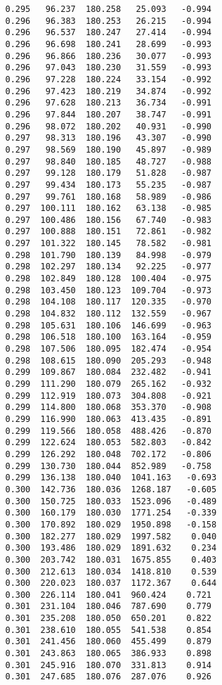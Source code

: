 \begin{verbatim}
   0.295   96.237  180.258   25.093   -0.994
   0.296   96.383  180.253   26.215   -0.994
   0.296   96.537  180.247   27.414   -0.994
   0.296   96.698  180.241   28.699   -0.993
   0.296   96.866  180.236   30.077   -0.993
   0.296   97.043  180.230   31.559   -0.993
   0.296   97.228  180.224   33.154   -0.992
   0.296   97.423  180.219   34.874   -0.992
   0.296   97.628  180.213   36.734   -0.991
   0.296   97.844  180.207   38.747   -0.991
   0.296   98.072  180.202   40.931   -0.990
   0.297   98.313  180.196   43.307   -0.990
   0.297   98.569  180.190   45.897   -0.989
   0.297   98.840  180.185   48.727   -0.988
   0.297   99.128  180.179   51.828   -0.987
   0.297   99.434  180.173   55.235   -0.987
   0.297   99.761  180.168   58.989   -0.986
   0.297  100.111  180.162   63.138   -0.985
   0.297  100.486  180.156   67.740   -0.983
   0.297  100.888  180.151   72.861   -0.982
   0.297  101.322  180.145   78.582   -0.981
   0.298  101.790  180.139   84.998   -0.979
   0.298  102.297  180.134   92.225   -0.977
   0.298  102.849  180.128  100.404   -0.975
   0.298  103.450  180.123  109.704   -0.973
   0.298  104.108  180.117  120.335   -0.970
   0.298  104.832  180.112  132.559   -0.967
   0.298  105.631  180.106  146.699   -0.963
   0.298  106.518  180.100  163.164   -0.959
   0.298  107.506  180.095  182.474   -0.954
   0.298  108.615  180.090  205.293   -0.948
   0.299  109.867  180.084  232.482   -0.941
   0.299  111.290  180.079  265.162   -0.932
   0.299  112.919  180.073  304.808   -0.921
   0.299  114.800  180.068  353.370   -0.908
   0.299  116.990  180.063  413.435   -0.891
   0.299  119.566  180.058  488.426   -0.870
   0.299  122.624  180.053  582.803   -0.842
   0.299  126.292  180.048  702.172   -0.806
   0.299  130.730  180.044  852.989   -0.758
   0.299  136.138  180.040  1041.163   -0.693
   0.300  142.736  180.036  1268.187   -0.605
   0.300  150.725  180.033  1523.096   -0.489
   0.300  160.179  180.030  1771.254   -0.339
   0.300  170.892  180.029  1950.898   -0.158
   0.300  182.277  180.029  1997.582    0.040
   0.300  193.486  180.029  1891.632    0.234
   0.300  203.742  180.031  1675.855    0.403
   0.300  212.613  180.034  1418.810    0.539
   0.300  220.023  180.037  1172.367    0.644
   0.300  226.114  180.041  960.424    0.721
   0.301  231.104  180.046  787.690    0.779
   0.301  235.208  180.050  650.201    0.822
   0.301  238.610  180.055  541.538    0.854
   0.301  241.456  180.060  455.499    0.879
   0.301  243.863  180.065  386.933    0.898
   0.301  245.916  180.070  331.813    0.914
   0.301  247.685  180.076  287.076    0.926

\end{verbatim}
